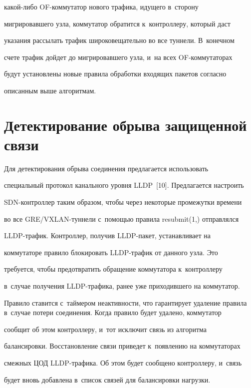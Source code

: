 ка\-кой-ли\-бо OF-ком\-му\-та\-тор нового трафика, идущего в~сторону 


мигрировавшего узла, коммутатор обратится к~контроллеру, который даст 


указания рассылать трафик широковещательно во все туннели. В~конечном 


счете трафик дойдет до мигрировавшего узла, и~на всех OF-ком\-му\-та\-то\-рах 


будут установлены новые правила обработки входящих пакетов согласно 


описанным выше алгоритмам.





\section{Детектирование обрыва защищенной связи}





  Для детектирования обрыва соединения предлагается использовать 


специальный протокол канального уровня LLDP~[10]. Предлагается настроить 


SDN-контроллер таким образом, чтобы через некоторые промежутки времени 


во все GRE/VXLAN-тун\-не\-ли с~по\-мощью правила resubmit(1,) отправлялся 


LLDP-тра\-фик. Контроллер, получив LLDP-па\-кет, устанавливает на 


коммутаторе правило блокировать LLDP-тра\-фик от данного узла. Это 


требуется, чтобы предотвратить обращение коммутатора к~контроллеру 


в~случае получения LLDP-тра\-фи\-ка, ранее уже приходившего на коммутатор. 


Правило ставится с~таймером неактивности, что гарантирует удаление правила в~случае потери соединения. Когда правило будет удалено, коммутатор 


сообщит об этом контроллеру, и~тот исключит связь из алгоритма 


балансировки. Восстановление связи приведет к~появлению на коммутаторах 


смежных ЦОД LLDP-тра\-фи\-ка. Об этом будет сообщено контроллеру, и~связь 


будет вновь добавлена в~список связей для балансировки нагрузки.


